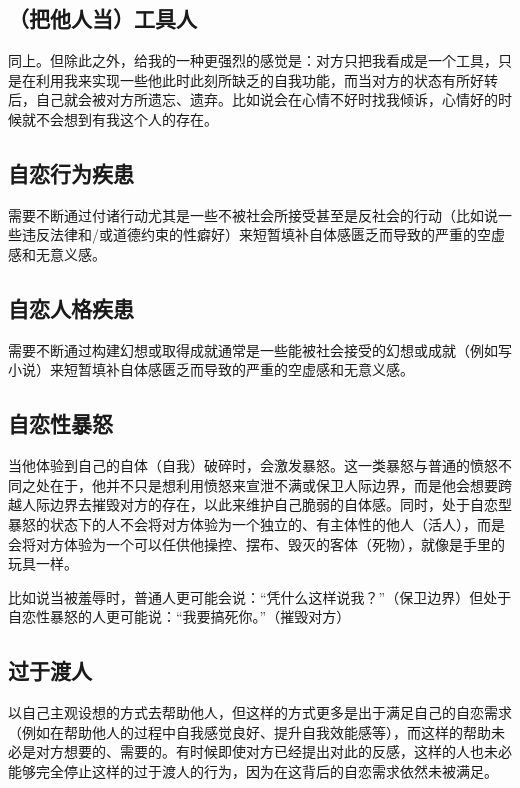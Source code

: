 \subsection*{（把他人当）工具人}

同上。但除此之外，给我的一种更强烈的感觉是：对方只把我看成是一个工具，只是在利用我来实现一些他此时此刻所缺乏的自我功能，而当对方的状态有所好转后，自己就会被对方所遗忘、遗弃。比如说会在心情不好时找我倾诉，心情好的时候就不会想到有我这个人的存在。

\subsection*{自恋行为疾患}

需要不断通过付诸行动\pozhehao{}尤其是一些不被社会所接受甚至是反社会的行动（比如说一些违反法律和/或道德约束的性癖好）\pozhehao{}来短暂填补自体感匮乏而导致的严重的空虚感和无意义感。

\subsection*{自恋人格疾患}

需要不断通过构建幻想或取得成就\pozhehao{}通常是一些能被社会接受的幻想或成就（例如写小说）\pozhehao{}来短暂填补自体感匮乏而导致的严重的空虚感和无意义感。

\subsection*{自恋性暴怒}

当他体验到自己的自体（自我）破碎时，会激发暴怒。这一类暴怒与普通的愤怒不同之处在于，他并不只是想利用愤怒来宣泄不满或保卫人际边界，而是他会想要跨越人际边界去摧毁对方的存在，以此来维护自己脆弱的自体感。同时，处于自恋型暴怒的状态下的人不会将对方体验为一个独立的、有主体性的他人（活人），而是会将对方体验为一个可以任供他操控、摆布、毁灭的客体（死物），就像是手里的玩具一样。

比如说当被羞辱时，普通人更可能会说：“凭什么这样说我？”（保卫边界）但处于自恋性暴怒的人更可能说：“我要搞死你。”（摧毁对方）

\subsection*{过于渡人}

以自己主观设想的方式去帮助他人，但这样的方式更多是出于满足自己的自恋需求（例如在帮助他人的过程中自我感觉良好、提升自我效能感等），而这样的帮助未必是对方想要的、需要的。有时候即使对方已经提出对此的反感，这样的人也未必能够完全停止这样的过于渡人的行为，因为在这背后的自恋需求依然未被满足。

